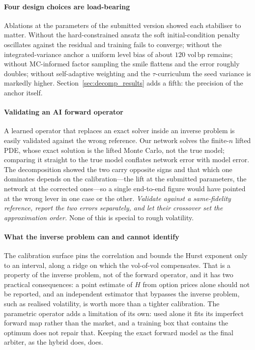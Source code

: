 \documentclass[preprint,12pt]{elsarticle}
\newcommand{\bp}{\ensuremath{\,\mathrm{bp}}}
\begin{document}
\paragraph{Four design choices are load-bearing}
Ablations at the parameters of the submitted version showed each stabiliser to
matter. Without the hard-constrained ansatz the soft initial-condition penalty
oscillates against the residual and training fails to converge; without the
integrated-variance anchor a uniform level bias of about $120$ vol\bp{} remains;
without MC-informed factor sampling the smile flattens and the error roughly
doubles; without self-adaptive weighting and the $\tau$-curriculum the seed
variance is markedly higher. Section~\ref{sec:decomp_results} adds a fifth: the
precision of the anchor itself.

\paragraph{Validating an AI forward operator}
A learned operator that replaces an exact solver inside an inverse problem is
easily validated against the wrong reference. Our network solves the finite-$n$
lifted PDE, whose exact solution is the lifted Monte Carlo, not the true model;
comparing it straight to the true model conflates network error with model
error. The decomposition showed the two carry opposite signs and that which one
dominates depends on the calibration---the lift at the submitted parameters, the
network at the corrected ones---so a single end-to-end figure would have pointed
at the wrong lever in one case or the other. \emph{Validate against a
same-fidelity reference, report the two errors separately, and let their
crossover set the approximation order.} None of this is special to rough
volatility.

\paragraph{What the inverse problem can and cannot identify}
The calibration surface pins the correlation and bounds the Hurst exponent only
to an interval, along a ridge on which the vol-of-vol compensates. That is a
property of the inverse problem, not of the forward operator, and it has two
practical consequences: a point estimate of $H$ from option prices alone should
not be reported, and an independent estimator that bypasses the inverse problem,
such as realised volatility, is worth more than a tighter calibration. The
parametric operator adds a limitation of its own: used alone it fits its
imperfect forward map rather than the market, and a training box that contains
the optimum does not repair that. Keeping the exact forward model as the final
arbiter, as the hybrid does, does.
\end{document}

